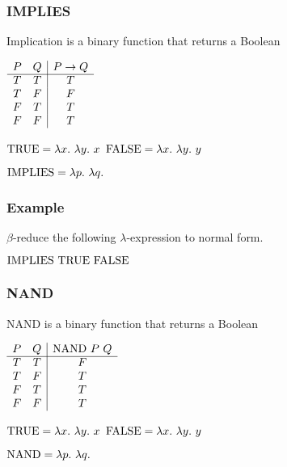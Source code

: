 \documentclass{beamer}
\begin{document}
\begin{frame}
	\frametitle{IMPLIES}

	Implication is a binary function that returns a Boolean

	\begin{center}
		$\begin{array}{ c c | c }			
			P & Q & P \to Q\\
			\cline{1 - 3}
			T & T & T \\ 
			T & F & F \\ 
			F & T & T \\ 
			F & F & T
		\end{array}$
	\end{center}

	$\TRUE = \lambda x. \ \lambda y. \ x$ \hspace{4cm} $\FALSE = \lambda x. \ \lambda y. \ y$

	\vspace{0.5cm}

	$\IMP = \lambda p. \ \lambda q. \  $

	\vspace{2cm}
	
\end{frame}

\begin{frame}
	\frametitle{Example}

	$\beta$-reduce the following $\lambda$-expression to normal form.

	\vspace{0.5cm}

	$\text{IMPLIES} \ \text{TRUE} \ \text{FALSE}$

	\vspace{6cm}


\end{frame}

\begin{frame}
	\frametitle{NAND}

	NAND is a binary function that returns a Boolean

	\begin{center}
		$\begin{array}{ c c | c }			
			P & Q & \NAND \ P \ Q\\
			\cline{1 - 3}
			T & T & F \\ 
			T & F & T \\ 
			F & T & T \\ 
			F & F & T
		\end{array}$
	\end{center}

	$\TRUE = \lambda x. \ \lambda y. \ x$ \hspace{4cm} $\FALSE = \lambda x. \ \lambda y. \ y$

	\vspace{0.5cm}

	$\NAND = \lambda p. \ \lambda q. \  $

	\vspace{2cm}
	
\end{frame}
\end{document}

